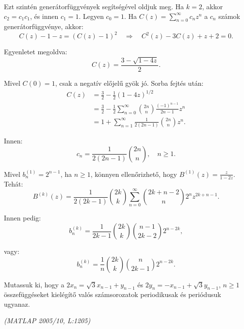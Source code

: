 \begin{solution}
Ezt szintén generátorfüggvények segítségével oldjuk meg. Ha $k=2$,
akkor $c_{2}=c_{1}c_{1}$, és innen $c_{1}=1$. Legyen $c_{0}=1$.
Ha $C(z)=\sum_{n=0}^{\infty}c_{n}z^{n}$ a $c_{n}$ számok generátorfüggvénye,
akkor: 
\[
C(z)-1-z=(C(z)-1)^{2}\quad\Rightarrow\quad C^{2}(z)-3C(z)+z+2=0.
\]

Egyenletet megoldva: 
\[
C(z)=\frac{3-\sqrt{1-4z}}{2}.
\]

Mivel $C(0)=1$, csak a negatív előjelű gyök jó. Sorba fejtés után:
\begin{align*}
C(z) & =\frac{3}{2}-\frac{1}{2}(1-4z)^{1/2}\\
 & =\frac{3}{2}-\frac{1}{2}\sum_{n=0}^{\infty}\binom{2n}{n}\frac{(-1)^{n-1}}{2n-1}z^{n}\\
 & =1+\sum_{n=1}^{\infty}\frac{1}{2(2n-1)}\binom{2n}{n}z^{n}.
\end{align*}

Innen: 
\[
c_{n}=\frac{1}{2(2n-1)}\binom{2n}{n},\quad n\geq1.
\]

Mivel $b_{n}^{(1)}=2^{n-1}$, ha $n\geq1$, könnyen ellenőrizhető,
hogy $B^{(1)}(z)=\frac{z}{1-2z}$. Tehát: 
\[
B^{(k)}(z)=\frac{1}{2(2k-1)}\binom{2k}{k}\sum_{n=0}^{\infty}\binom{2k+n-2}{n}2^{n}z^{2k+n-1}.
\]

Innen pedig: 
\[
b_{n}^{(k)}=\frac{1}{2k-1}\binom{2k}{k}\binom{n-1}{2k-2}2^{n-2k},
\]

vagy: 
\[
b_{n}^{(k)}=\frac{1}{n}\binom{2k}{k}\binom{n}{2k-1}2^{n-2k}.
\]
\end{solution}
\begin{extraproblem}
Mutassuk ki, hogy a $2x_{n}=\sqrt{3}x_{n-1}+y_{n-1}$ és $2y_{n}=-x_{n-1}+\sqrt{3}y_{n-1}$,
$n\geq1$ összefüggéseket kielégítő valós számsorozatok periodikusak
és periódusuk ugyanaz. 
\begin{flushright}
\textit{(MATLAP 2005/10, L:1205)} 
\par\end{flushright}
\end{extraproblem}

